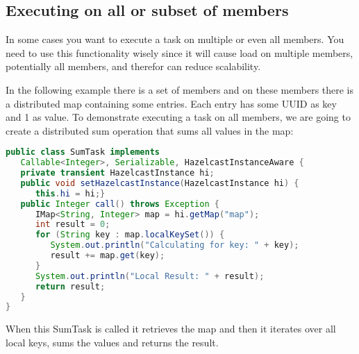\subsection{Executing on all or subset of members}
In some cases you want to execute a task on multiple or even all members. You need to use this functionality wisely since it will cause load on multiple members, potentially all members, and therefor can reduce scalability.

In the following example there is a set of members and on these members there is a distributed map containing some entries. Each entry has some UUID as key and 1 as value. To demonstrate executing a task on all members, we are going to create a distributed sum operation that sums all values in the map:
\begin{lstlisting}[language=java]
public class SumTask implements
   Callable<Integer>, Serializable, HazelcastInstanceAware {
   private transient HazelcastInstance hi;
   public void setHazelcastInstance(HazelcastInstance hi) {
      this.hi = hi;}
   public Integer call() throws Exception {
      IMap<String, Integer> map = hi.getMap("map");
      int result = 0;
      for (String key : map.localKeySet()) {
         System.out.println("Calculating for key: " + key);
         result += map.get(key);
      }
      System.out.println("Local Result: " + result);
      return result;
   }
}
\end{lstlisting}
When this SumTask is called it retrieves the map and then it iterates over all local keys, sums the values and returns the result.

